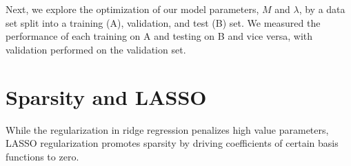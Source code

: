 \documentclass[12pt]{article}
\begin{document}

Next, we explore the optimization of our model parameters, $M$ and $\lambda$, by a data set split into a training (A), validation, and test (B) set. We measured the performance of each training on A and testing on B and vice versa, with validation performed on the validation set.








\section{Sparsity and LASSO}

While the regularization in ridge regression penalizes high value parameters, LASSO regularization promotes sparsity by driving coefficients of certain basis functions to zero.
\end{document}
